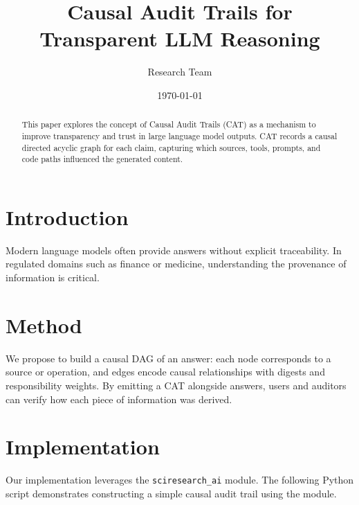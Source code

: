 \documentclass{article}
\title{Causal Audit Trails for Transparent LLM Reasoning}
\author{Research Team}
\date{\today}
\begin{document}
\maketitle

\begin{abstract}
This paper explores the concept of Causal Audit Trails (CAT) as a mechanism to improve transparency and trust in large language model outputs. CAT records a causal directed acyclic graph for each claim, capturing which sources, tools, prompts, and code paths influenced the generated content.
\end{abstract}

\section{Introduction}
Modern language models often provide answers without explicit traceability. In regulated domains such as finance or medicine, understanding the provenance of information is critical.

\section{Method}
We propose to build a causal DAG of an answer: each node corresponds to a source or operation, and edges encode causal relationships with digests and responsibility weights. By emitting a CAT alongside answers, users and auditors can verify how each piece of information was derived.

\section{Implementation}
Our implementation leverages the \texttt{sciresearch\_ai} module. The following Python script demonstrates constructing a simple causal audit trail using the module.
\end{document}
